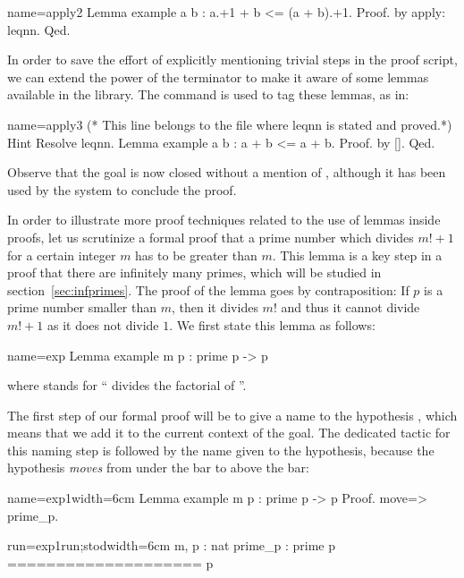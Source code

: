 \begin{coq}{name=apply2}{}
Lemma example a b : a.+1 + b <= (a + b).+1.
Proof. by apply: leqnn. Qed.
\end{coq}
In order to save the effort of explicitly mentioning trivial
steps in the proof script, we can extend the power of the 
terminator to make it aware of some lemmas available in
the library. The  command is used to tag these lemmas,
as in:

\begin{coq}{name=apply3}{}
(* This line belongs to the file where leqnn is stated and proved.*)
Hint Resolve leqnn.
Lemma example a b : a + b <= a + b.
Proof. by [].  Qed.
\end{coq}
Observe that the goal is now closed without a mention of ,
although it has been used by the system to conclude the proof.

In order to illustrate more proof techniques related to the use of
lemmas inside proofs, let us scrutinize a formal proof that a prime
number which divides $m! + 1$ for a certain integer $m$ has to be
greater than $m$. This lemma is a key step in a proof that there are
infinitely many primes, which will be studied in
section~\ref{sec:infprimes}. The proof of the lemma goes by
contraposition: If $p$ is a prime number smaller than $m$, then it
divides $m!$ and thus it cannot divide $m! + 1$ as it does not divide
$1$. We first state this lemma as follows:

\begin{coq}{name=exp}{}
Lemma example m p : prime p -> p %
\end{coq}

where  stands for `` divides the factorial of ''.

The first step of our formal proof will be to give a name to the
hypothesis , which means that we add it to the
current context of the goal. The dedicated tactic for this naming step is
 followed by the name given to the hypothesis, because the
hypothesis \emph{moves} from under the bar to above the bar:

\begin{coq-left}{name=exp1}{width=6cm}
Lemma example m p : prime p ->
  p %
Proof.
move=> prime_p.
\end{coq-left}
\begin{coqout-right}{run=exp1run;stod}{width=6cm}
m, p : nat
prime_p : prime p
====================
p %
\end{coqout-right}

